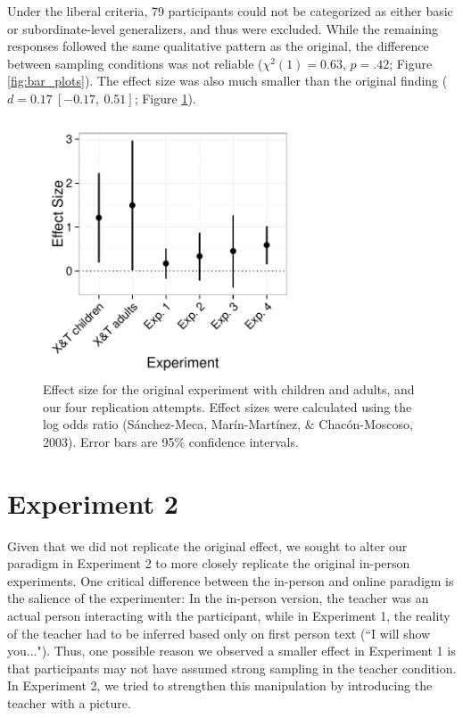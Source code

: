 \documentclass[man]{apa2}
\begin{document}
Under the liberal criteria, 79 participants could not be categorized as either basic or subordinate-level generalizers, and thus were excluded. While the  remaining responses followed the same qualitative pattern as the original, the difference  between sampling conditions was not reliable ($\chi^2(1) = 0.63$,  $p = .42$; Figure \ref{fig:bar_plots}). The effect size was also much smaller than the original finding ($d = 0.17\ [-0.17,\ 0.51]$; Figure \ref{fig:effect_sizes}).

 \begin{figure} [t]
  \includegraphics[width=3in]{figures/FIG_3.pdf} 
  \caption{\label{fig:effect_sizes} Effect size for the original experiment with children and adults, and our four replication attempts.  Effect sizes were calculated using the log odds ratio (S\'{a}nchez-Meca, Mar\'{i}n-Mart\'{i}nez, \& Chac\'{o}n-Moscoso, 2003). Error bars are 95\% confidence intervals.} 
\end{figure}


\section{Experiment 2}

Given that we did not replicate the original effect,  we sought to alter our paradigm in Experiment 2 to more closely replicate the original in-person experiments. One critical difference between the in-person and online paradigm is the salience of the experimenter: In the in-person version, the teacher was an actual person interacting with the participant, while in Experiment 1, the reality of the teacher had to be inferred based only on first person text (``I will show you..."). Thus, one possible reason we observed a smaller effect  in Experiment 1 is that  participants may not have assumed strong sampling in the teacher condition. In Experiment 2, we tried to strengthen this manipulation by introducing the teacher with a picture.
\end{document}
